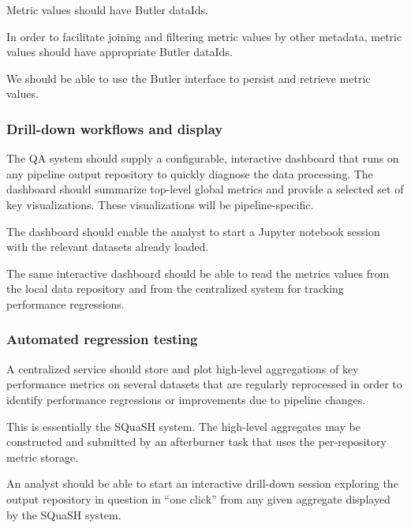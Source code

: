 \begin{recommendation}
Metric values should have Butler dataIds.
\end{recommendation}

In order to facilitate joining and filtering metric values by other metadata, metric values should have appropriate Butler dataIds.

\begin{recommendation}
We should be able to use the Butler interface to persist and retrieve metric values.
\end{recommendation}

\subsubsection{Drill-down workflows and display} \label{sec:metric_displays}

\begin{recommendation}
The QA system should supply a configurable, interactive dashboard that runs on any pipeline output repository to quickly diagnose the data processing.
The dashboard should summarize top-level global metrics and provide a selected set of key visualizations.
These visualizations will be pipeline-specific.
\end{recommendation}

\begin{recommendation}
The dashboard should enable the analyst to start a Jupyter notebook session with the relevant datasets already loaded.
\end{recommendation}

\begin{recommendation}
The same interactive dashboard should be able to read the metrics values from the local data repository and from the centralized system for tracking performance regressions.
\end{recommendation}


\subsubsection{Automated regression testing} \label{sec:regression}


\begin{recommendation}
A centralized service should store and plot high-level aggregations of key performance metrics on several datasets that are regularly reprocessed in order to identify performance regressions or improvements due to pipeline changes.
\end{recommendation}

This is essentially the SQuaSH system.
The high-level aggregates may be constructed and submitted by an afterburner task that uses the per-repository metric storage.

\begin{recommendation}
An analyst should be able to start an interactive drill-down session exploring the output repository in question in ``one click'' from any given aggregate displayed by the SQuaSH system.
\end{recommendation}
